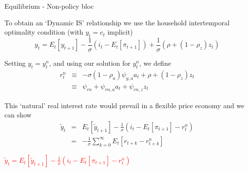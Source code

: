 \documentclass{beamer}
\begin{document}
\begin{frame}{Equilibrium - Non-policy bloc}

To obtain an `Dynamic IS' relationship we use the household intertemporal optimality condition (with $y_{t}=c_{t}$ implicit)
\[
y_{t} = E_{t} \left[ y_{t+1} \right] - \frac{1}{\sigma} \left(i_{t} - E_{t}\left[ \pi_{t+1} \right] \right) + \frac{1}{\sigma} \left( \rho + \left( 1 - \rho_{z} \right) z_{t} \right)
\]

Setting $y_{t}=y^{n}_{t}$, and using our solution for $y^{n}_{t}$, we define
\begin{eqnarray}
r^{n}_{t} 	&\equiv&	-\sigma (1-\rho_{a})\psi_{y,a}a_{t} + \rho + (1-\rho_{z})z_{t} \label{eqn:rn_equilib}\\
			&\equiv&	\psi_{rn} + \psi_{rn,a} a_{t} + \psi_{rn,z} z_{t} \nonumber
\end{eqnarray}

This `natural' real interest rate would prevail in a flexible price economy and we can show
\begin{eqnarray}
\tilde{y}_{t} &=& E_{t} \left[ \tilde{y}_{t+1} \right] - \frac{1}{\sigma} \left(i_{t} - E_{t}\left[ \pi_{t+1} \right]  - r^{n}_{t} \right) \label{eqn:dyn_IS} \\
&=& -\frac{1}{\sigma} \sum\limits_{k=0}^{\infty} E_{t}[ r_{t+k}  - r^{n}_{t+k} ] \nonumber
\end{eqnarray}

\end{frame}



\begin{frame}

\begin{center}
{\huge\textcolor{red}{ $\tilde{y}_{t} = E_{t} \left[ \tilde{y}_{t+1} \right] - \frac{1}{\sigma} \left(i_{t} - E_{t}\left[ \pi_{t+1} \right]  - r^{n}_{t} \right) $}}
\end{center}

\end{frame}


	
\end{document}
